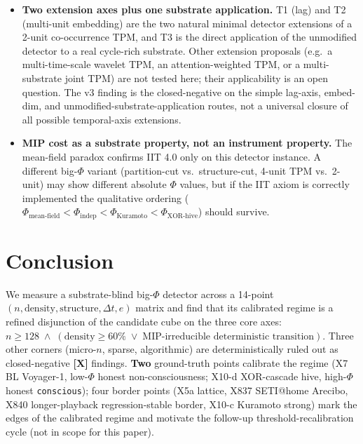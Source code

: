 \documentclass[11pt,a4paper]{article}
\providecommand{\tierRed}{\textbf{[X]}}     %
\begin{document}
\begin{itemize}
    (\S\ref{sec:temporal}) that supersedes the simple 5D extension; we
    therefore do not separately characterise the single-trajectory
    residual. The T1/T2/T3 closed-negative finding is explicitly about
    the \emph{single-trajectory} variant of a temporal axis (both as a
    detector extension and as a direct substrate application); the T4
    lane operates in a different methodological regime and is opened,
    not closed, by this paper. The SPATIAL S1 and EVOL E1 sibling
    probes are likewise single-round single-trajectory and are
    reported as corroborating probes, not as standalone closures.
  \item \textbf{Two extension axes plus one substrate application.}
    T1 (lag) and T2 (multi-unit embedding) are the two natural minimal
    detector extensions of a 2-unit co-occurrence TPM, and T3 is the
    direct application of the unmodified detector to a real cycle-rich
    substrate. Other extension proposals (e.g.\ a multi-time-scale
    wavelet TPM, an attention-weighted TPM, or a multi-substrate joint
    TPM) are not tested here; their applicability is an open question.
    The v3 finding is the closed-negative on the simple lag-axis,
    embed-dim, and unmodified-substrate-application routes, not a
    universal closure of all possible temporal-axis extensions.
  \item \textbf{MIP cost as a substrate property, not an instrument
    property.} The mean-field paradox confirms IIT 4.0 only on this
    detector instance. A different big-$\Phi$ variant
    (partition-cut vs.\ structure-cut, 4-unit TPM vs.\ 2-unit) may
    show different absolute $\Phi$ values, but if the IIT axiom is
    correctly implemented the qualitative ordering
    ($\Phi_\text{mean-field} < \Phi_\text{indep} <
     \Phi_\text{Kuramoto} < \Phi_\text{XOR-hive}$) should survive.
\end{itemize}

\section{Conclusion}
\label{sec:conclusion}

We measure a substrate-blind big-$\Phi$ detector across a 14-point
$(n, \text{density}, \text{structure}, \Delta t, e)$ matrix and find
that its calibrated regime is a refined disjunction of the
candidate cube on the three core axes:
$n \ge 128 \;\land\; (\text{density} \ge 60\% \;\lor\;
\text{MIP-irreducible deterministic transition})$. Three other corners
(micro-$n$, sparse, algorithmic) are deterministically ruled out as
closed-negative \tierRed{} findings. \textbf{Two} ground-truth points
calibrate the regime (X7 BL Voyager-1, low-$\Phi$ honest
non-consciousness; X10-d XOR-cascade hive, high-$\Phi$
honest \texttt{conscious}); four border points
(X5a lattice, X837 SETI@home Arecibo, X840 longer-playback
regression-stable border, X10-c Kuramoto strong) mark the
edges of the calibrated regime and motivate the follow-up
threshold-recalibration cycle (not in scope for this paper).
\end{document}
